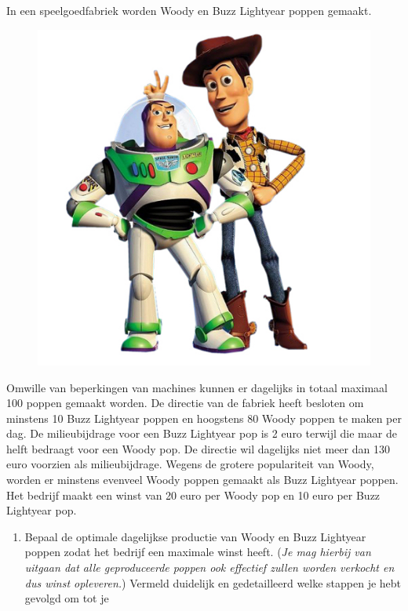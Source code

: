 \begin{oef} \label{oef:toy-story}
In een speelgoedfabriek worden Woody
en Buzz Lightyear poppen gemaakt. 
\begin{figure}[ht]
  \centering
    \includegraphics[scale=0.5]{oefeningen/FigurenLP/Buzz-Woody.jpg}
\end{figure}
Omwille van beperkingen van machines
kunnen er dagelijks in totaal maximaal 100 poppen gemaakt worden. De
directie van de fabriek heeft besloten om minstens 10 Buzz Lightyear
poppen en hoogstens 80 Woody poppen te maken per dag. 
De milieubijdrage
voor een Buzz Lightyear pop is 2 euro terwijl die maar de helft
bedraagt voor een Woody pop. De directie wil dagelijks niet meer dan 130
euro voorzien als milieubijdrage. Wegens de grotere populariteit van
Woody, worden er minstens evenveel Woody poppen gemaakt als Buzz
Lightyear poppen. Het bedrijf maakt een winst van 20 euro per Woody pop
en 10 euro per Buzz Lightyear pop.
\begin{enumerate}
  \item Bepaal de optimale dagelijkse productie van Woody en Buzz
        Lightyear poppen zodat het bedrijf een maximale winst heeft.
        (\textit{Je mag hierbij van uitgaan dat alle geproduceerde poppen ook
        effectief zullen worden verkocht en dus winst opleveren.}) Vermeld
        duidelijk en gedetailleerd welke stappen je hebt gevolgd om tot je

\end{enumerate}
\end{oef}
